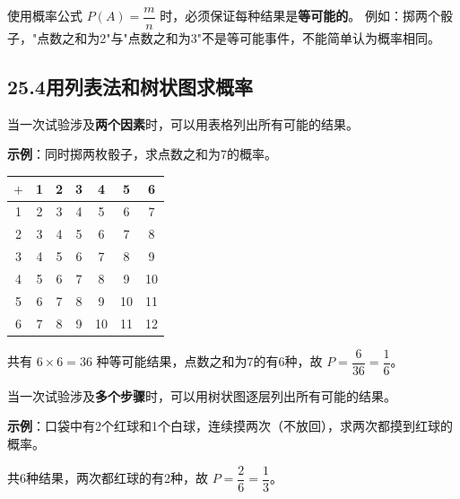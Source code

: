\documentclass[12pt, a4paper]{ctexart}
\begin{document}
\begin{warnbox}[易错提醒]
使用概率公式 $P(A) = \dfrac{m}{n}$ 时，必须保证每种结果是\textbf{等可能的}。
例如：掷两个骰子，"点数之和为2"与"点数之和为3"不是等可能事件，不能简单认为概率相同。
\end{warnbox}

\subsection*{25.4\quad 用列表法和树状图求概率}

\begin{knowledgebox}[5. 列表法]
当一次试验涉及\textbf{两个因素}时，可以用表格列出所有可能的结果。

\medskip
\textbf{示例}：同时掷两枚骰子，求点数之和为7的概率。

\medskip
\begin{center}
\begin{tabular}{c|cccccc}
$+$ & 1 & 2 & 3 & 4 & 5 & 6 \\
\hline
1 & 2 & 3 & 4 & 5 & 6 & 7 \\
2 & 3 & 4 & 5 & 6 & 7 & 8 \\
3 & 4 & 5 & 6 & 7 & 8 & 9 \\
4 & 5 & 6 & 7 & 8 & 9 & 10 \\
5 & 6 & 7 & 8 & 9 & 10 & 11 \\
6 & 7 & 8 & 9 & 10 & 11 & 12 \\
\end{tabular}
\end{center}

共有 $6 \times 6 = 36$ 种等可能结果，点数之和为7的有6种，故 $P = \dfrac{6}{36} = \dfrac{1}{6}$。
\end{knowledgebox}

\begin{knowledgebox}[6. 树状图法]
当一次试验涉及\textbf{多个步骤}时，可以用树状图逐层列出所有可能的结果。

\medskip
\textbf{示例}：口袋中有2个红球和1个白球，连续摸两次（不放回），求两次都摸到红球的概率。

\medskip
\begin{center}
\end{center}

共6种结果，两次都红球的有2种，故 $P = \dfrac{2}{6} = \dfrac{1}{3}$。
\end{knowledgebox}
\end{document}
